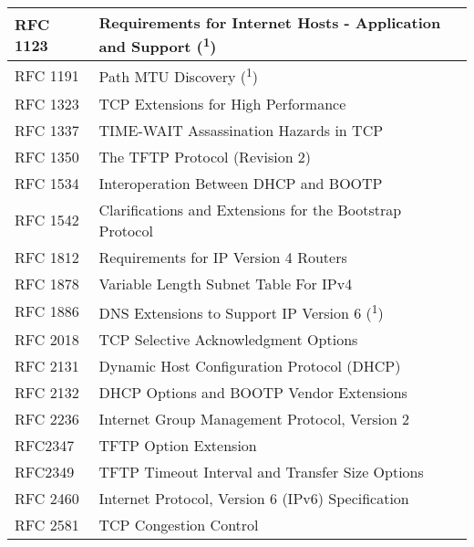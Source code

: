 \begin{longtable}{ | l | p{15cm} | }
RFC 1123 &
Requirements for Internet Hosts - Application and Support (\textsuperscript{1}) \\ \hline

RFC 1191 &
Path MTU Discovery (\textsuperscript{1})\\ \hline

RFC 1323 &
TCP Extensions for High Performance \\ \hline

RFC 1337 &
TIME-WAIT Assassination Hazards in TCP \\ \hline

RFC 1350 &
The TFTP Protocol (Revision 2) \\ \hline

RFC 1534 &
Interoperation Between DHCP and BOOTP \\ \hline

RFC 1542 &
Clarifications and Extensions for the Bootstrap Protocol \\ \hline

RFC 1812 &
Requirements for IP Version 4 Routers \\ \hline

RFC 1878 &
Variable Length Subnet Table For IPv4 \\ \hline

RFC 1886 &
DNS Extensions to Support IP Version 6 (\textsuperscript{1}) \\ \hline

RFC 2018 &
TCP Selective Acknowledgment Options \\ \hline

RFC 2131 &
Dynamic Host Configuration Protocol (DHCP) \\ \hline

RFC 2132 &
DHCP Options and BOOTP Vendor Extensions \\ \hline

RFC 2236 &
Internet Group Management Protocol, Version 2 \\ \hline

RFC2347 &
TFTP Option Extension \\ \hline

RFC2349 &
TFTP Timeout Interval and Transfer Size Options \\ \hline

RFC 2460 &
Internet Protocol, Version 6 (IPv6) Specification \\ \hline

RFC 2581 &
TCP Congestion Control \\ \hline


\end{longtable}
